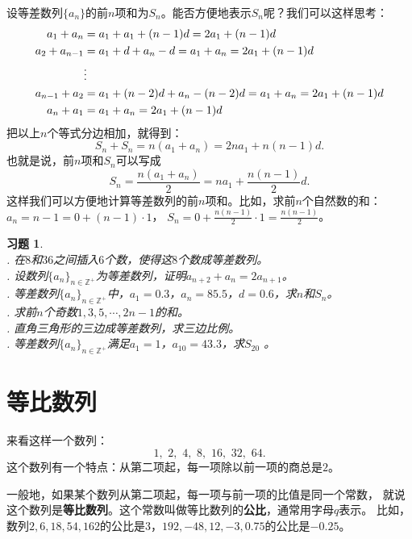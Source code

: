 \documentclass[12pt,UTF8]{ctexbook}
\newtheorem{xt}{习题}[section]
\begin{document}
设等差数列$\{a_n\}$的前$n$项和为$S_n$。能否方便地表示$S_n$呢？我们可以这样思考：
\begin{align}
a_{1} + a_{n} &= a_1 + a_1 + (n-1)d = 2a_1 + (n-1)d \notag \\
a_{2} + a_{n-1} &= a_1 + d + a_n - d = a_1 + a_n = 2a_1 + (n-1)d \notag \\
&\vdots \notag \\
a_{n-1} + a_{2} &= a_1 + (n-2)d + a_n - (n-2)d = a_1 + a_n =  2a_1 + (n-1)d \notag \\
a_{n} + a_{1} &= a_1 + a_n = 2a_1 + (n-1)d \notag 
\end{align}
把以上$n$个等式分边相加，就得到：
$$ S_n + S_n = n(a_1 + a_n) = 2na_1 + n(n-1)d. $$
也就是说，前$n$项和$S_n$可以写成
$$ S_n = \frac{n(a_1 + a_n)}{2} = na_1 + \frac{n(n-1)}{2}d. $$
这样我们可以方便地计算等差数列的前$n$项和。比如，求前$n$个自然数的和：$a_n = n-1 = 0 + (n-1)\cdot 1$，
$S_n = 0 + \frac{n(n-1)}{2}\cdot 1 = \frac{n(n-1)}{2}$。

\begin{xt}
    \mbox{} \\
    . 在$8$和$36$之间插入$6$个数，使得这$8$个数成等差数列。\\
    . 设数列$\{a_n\}_{n\in\mathbb{Z}^+}$为等差数列，证明$a_{n+2} + a_n = 2a_{n+1}$。\\
    . 等差数列$\{a_n\}_{n\in\mathbb{Z}^+}$中，$a_1 = 0.3$，$a_n = 85.5$，$d = 0.6$，求$n$和$S_n$。\\
    . 求前$n$个奇数$1,3,5,\cdots, 2n-1$的和。\\
    . 直角三角形的三边成等差数列，求三边比例。\\
    . 等差数列$\{a_n\}_{n\in\mathbb{Z}^+}$满足$a_1 = 1$，$a_{10}=43.3$，求$S_{20}$ 。    
\end{xt}

\section{等比数列}

来看这样一个数列：
$$ 1,\,\,2,\,\,4,\,\,8,\,\,16,\,\,32,\,\,64. $$
这个数列有一个特点：从第二项起，每一项除以前一项的商总是$2$。

一般地，如果某个数列从第二项起，每一项与前一项的比值是同一个常数，
就说这个数列是\textbf{等比数列}。这个常数叫做等比数列的\textbf{公比}，通常用字母$q$表示。
比如，数列$2,6,18,54,162$的公比是$3$，$192,-48,12,-3,0.75$的公比是$-0.25$。
\end{document}
